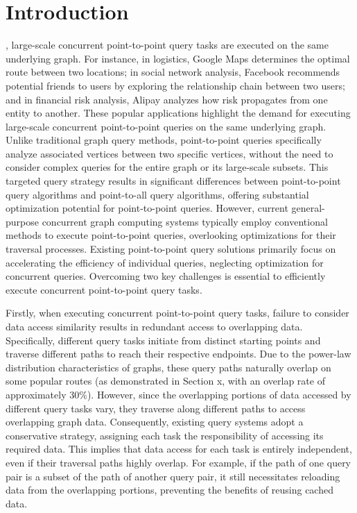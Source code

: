 \documentclass[lettersize,journal]{IEEEtran} %
\begin{document}
\section{Introduction}
, large-scale concurrent point-to-point query tasks are executed on the same underlying graph. For instance, in logistics, Google Maps\cite{google} determines the optimal route between two locations; in social network analysis, Facebook\cite{facebook} recommends potential friends to users by exploring the relationship chain between two users; and in financial risk analysis, Alipay\cite{alipay} analyzes how risk propagates from one entity to another. These popular applications highlight the demand for executing large-scale concurrent point-to-point queries on the same underlying graph. Unlike traditional graph query methods, point-to-point queries specifically analyze associated vertices between two specific vertices, without the need to consider complex queries for the entire graph or its large-scale subsets. This targeted query strategy results in significant differences between point-to-point query algorithms and point-to-all query algorithms, offering substantial optimization potential for point-to-point queries. However, current general-purpose concurrent graph computing systems\cite{glign} typically employ conventional methods to execute point-to-point queries, overlooking optimizations for their traversal processes. Existing point-to-point query solutions\cite{sgraph}\cite{tripoline}\cite{pnp} primarily focus on accelerating the efficiency of individual queries, neglecting optimization for concurrent queries. Overcoming two key challenges is essential to efficiently execute concurrent point-to-point query tasks.


Firstly, when executing concurrent point-to-point query tasks, failure to consider data access similarity results in redundant access to overlapping data. Specifically, different query tasks initiate from distinct starting points and traverse different paths to reach their respective endpoints. Due to the power-law distribution characteristics of graphs, these query paths naturally overlap on some popular routes (as demonstrated in Section x, with an overlap rate of approximately 30\%). However, since the overlapping portions of data accessed by different query tasks vary, they traverse along different paths to access overlapping graph data. Consequently, existing query systems adopt a conservative strategy, assigning each task the responsibility of accessing its required data. This implies that data access for each task is entirely independent, even if their traversal paths highly overlap. For example, if the path of one query pair is a subset of the path of another query pair, it still necessitates reloading data from the overlapping portions, preventing the benefits of reusing cached data.
\end{document}
